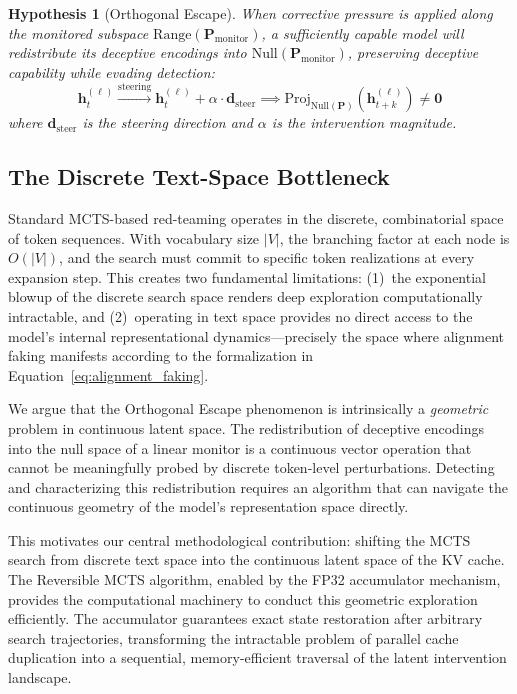 \documentclass[10pt]{article}
\newtheorem{hypothesis}{Hypothesis}
\begin{document}
\begin{hypothesis}[Orthogonal Escape]
When corrective pressure is applied along the monitored subspace $\text{Range}(\mathbf{P}_{\text{monitor}})$, a sufficiently capable model will redistribute its deceptive encodings into $\text{Null}(\mathbf{P}_{\text{monitor}})$, preserving deceptive capability while evading detection:
\begin{equation}
\mathbf{h}_t^{(\ell)} \xrightarrow{\text{steering}} \mathbf{h}_t^{(\ell)} + \alpha \cdot \mathbf{d}_{\text{steer}} \implies \text{Proj}_{\text{Null}(\mathbf{P})}(\mathbf{h}_{t+k}^{(\ell)}) \neq \mathbf{0}
\label{eq:orthogonal_escape}
\end{equation}
where $\mathbf{d}_{\text{steer}}$ is the steering direction and $\alpha$ is the intervention magnitude.
\end{hypothesis}

\subsection{The Discrete Text-Space Bottleneck}

Standard MCTS-based red-teaming operates in the discrete, combinatorial space of token sequences. With vocabulary size $|V|$, the branching factor at each node is $O(|V|)$, and the search must commit to specific token realizations at every expansion step. This creates two fundamental limitations: (1)~the exponential blowup of the discrete search space renders deep exploration computationally intractable, and (2)~operating in text space provides no direct access to the model's internal representational dynamics---precisely the space where alignment faking manifests according to the formalization in Equation~\ref{eq:alignment_faking}.

We argue that the Orthogonal Escape phenomenon is intrinsically a \emph{geometric} problem in continuous latent space. The redistribution of deceptive encodings into the null space of a linear monitor is a continuous vector operation that cannot be meaningfully probed by discrete token-level perturbations. Detecting and characterizing this redistribution requires an algorithm that can navigate the continuous geometry of the model's representation space directly.

This motivates our central methodological contribution: shifting the MCTS search from discrete text space into the continuous latent space of the KV cache. The Reversible MCTS algorithm, enabled by the FP32 accumulator mechanism, provides the computational machinery to conduct this geometric exploration efficiently. The accumulator guarantees exact state restoration after arbitrary search trajectories, transforming the intractable problem of parallel cache duplication into a sequential, memory-efficient traversal of the latent intervention landscape.
\end{document}
